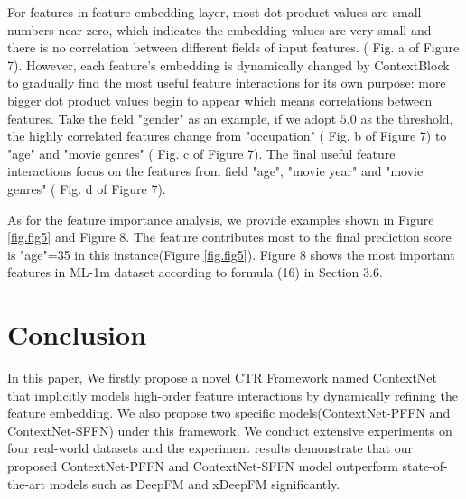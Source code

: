 \documentclass[sigconf]{acmart}
\begin{document}
For features in feature embedding layer, most dot product values are small numbers near zero, which indicates the embedding values are very small and there is no correlation between different fields of input features. ( Fig. a of Figure 7). However, each feature’s embedding is dynamically changed by ContextBlock to gradually find the most useful feature interactions for its own purpose: more bigger dot product values begin to appear which means correlations between features. Take the field "gender" as an example, if we adopt $5.0$ as the threshold, the highly correlated features change from "occupation" ( Fig. b of Figure 7) to "age" and "movie genres" ( Fig. c of Figure 7). The final useful feature interactions focus on the features from field
"age", "movie year" and "movie genres" ( Fig. d of Figure 7).


As for the feature importance analysis, we provide examples shown in Figure \ref{fig.fig5} and Figure 8. The feature contributes most to the final prediction score is {"age"=35} in this instance(Figure \ref{fig.fig5}). Figure 8 shows the most important features  in ML-1m dataset according to formula (16) in Section 3.6.








\section{Conclusion}

In this paper, We firstly propose a novel CTR Framework named ContextNet that implicitly models high-order feature interactions by dynamically refining the feature embedding. We also propose two specific models(ContextNet-PFFN and ContextNet-SFFN) under this framework. We conduct extensive experiments on four real-world datasets and the experiment results demonstrate that our proposed ContextNet-PFFN and ContextNet-SFFN model outperform state-of-the-art models such as DeepFM and xDeepFM significantly.







\end{document}
